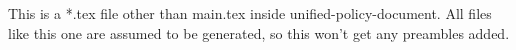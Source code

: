This is a *.tex file other than main.tex inside unified-policy-document.
All files like this one are assumed to be generated, so this won't get any preambles added.
